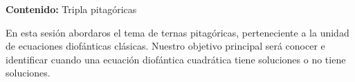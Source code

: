 {\Large\textbf{Contenido:} Tripla pitagóricas}

En esta sesión abordaros el tema de ternas pitagóricas, perteneciente a la unidad de ecuaciones diofánticas clásicas.
Nuestro objetivo principal será conocer e identificar cuando una ecuación diofántica cuadrática tiene soluciones o no tiene soluciones.

